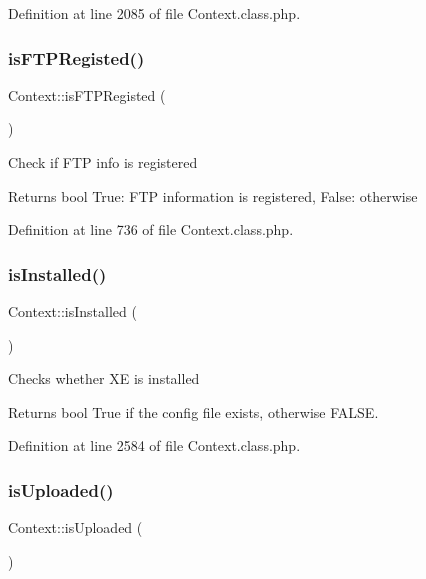 Definition at line 2085 of file Context.\+class.\+php.

\mbox{\label{classContext_aee42b43176df53b80d5bbf8f6ce14459}} 
\subsubsection{\texorpdfstring{is\+F\+T\+P\+Registed()}{isFTPRegisted()}}
{\footnotesize\ttfamily Context\+::is\+F\+T\+P\+Registed (\begin{DoxyParamCaption}{ }\end{DoxyParamCaption})}

Check if F\+TP info is registered

\begin{DoxyReturn}{Returns}
bool True\+: F\+TP information is registered, False\+: otherwise 
\end{DoxyReturn}


Definition at line 736 of file Context.\+class.\+php.

\mbox{\label{classContext_a5a8714e3a0f9d4722a31ce73017c6613}} 
\subsubsection{\texorpdfstring{is\+Installed()}{isInstalled()}}
{\footnotesize\ttfamily Context\+::is\+Installed (\begin{DoxyParamCaption}{ }\end{DoxyParamCaption})}

Checks whether XE is installed

\begin{DoxyReturn}{Returns}
bool True if the config file exists, otherwise F\+A\+L\+SE. 
\end{DoxyReturn}


Definition at line 2584 of file Context.\+class.\+php.

\mbox{\label{classContext_a65ee4d61d0211c8a3f0eeb4251c85892}} 
\subsubsection{\texorpdfstring{is\+Uploaded()}{isUploaded()}}
{\footnotesize\ttfamily Context\+::is\+Uploaded (\begin{DoxyParamCaption}{ }\end{DoxyParamCaption})}

